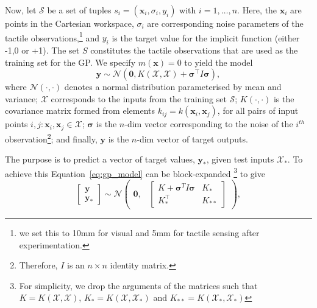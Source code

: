 Now, let $\mathcal{S}$ be a set of tuples $s_i = (\mathbf{x}_i, \sigma_i, y_i)$ with $i=1,\ldots,n$. Here, the $\mathbf{x}_i$ are points in the Cartesian workspace, $\sigma_i$ are corresponding noise parameters of the tactile observations,\footnote{we set this to 10mm for visual and 5mm for tactile sensing after experimentation.} and $y_i$ is the target value for the implicit function (either -1,0 or +1). The set $S$ constitutes the tactile observations that are used as the training set for the GP. We specify $m(\mathbf{x})=0$ to yield the model
\begin{equation}
\mathbf{y} \sim \mathcal{N}(\mathbf{0}, K(\mathcal{X},\mathcal{X}) + \boldsymbol{\sigma}^\top I \boldsymbol{\sigma}), \label{eq:gp_model}
\end{equation}
where $\mathcal{N}(\cdot, \cdot)$ denotes a normal distribution parameterised by mean and variance; $\mathcal{X}$ corresponds to the inputs from the training set $\mathcal{S}$;  $K(\cdot, \cdot)$ is the covariance matrix formed from  elements $k_{ij} = k(\mathbf{x}_i, \mathbf{x}_j)$, for all pairs of input points $i,j : \mathbf{x}_i, \mathbf{x}_j \in \mathcal{X}$; $\boldsymbol{\sigma}$ is the $n$-dim vector corresponding to the noise of the $i^{th}$ observation\footnote{Therefore, $I$ is an $n \times n$ identity matrix.}; and finally, $\mathbf{y}$ is the $n$-dim vector of target outputs. 

The purpose is to predict a vector of target values, $\mathbf{y}_*$, given test inputs $\mathcal{X}_*$. To achieve this Equation~\ref{eq:gp_model} can be block-expanded \footnote{For simplicity, we drop the arguments of the matrices such that $K = K(\mathcal{X},\mathcal{X})$, $K_* = K(\mathcal{X},\mathcal{X}_*)$ and $K_{**} = K(\mathcal{X}_*,\mathcal{X}_*)$} \cite{Rasmussen2006Gaussian} to give
\begin{equation}
    \begin{bmatrix} \mathbf{y} \\ \mathbf{y}_* \end{bmatrix} \sim
               \mathcal{N}\begin{pmatrix}\mathbf{0}, & \begin{bmatrix} K + \boldsymbol{\sigma}^{T} I \boldsymbol{\sigma} &
                                                 K_* \\
                                                 K_*^\top &
                                                 K_{**} \end{bmatrix}
                           \end{pmatrix},
\end{equation}

